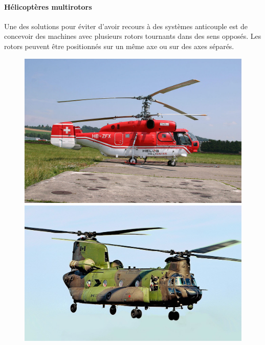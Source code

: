 		\paragraph{Hélicoptères multirotors}
		Une des solutions pour éviter d'avoir recours à des systèmes anticouple est de concevoir des machines avec plusieurs rotors tournants dans des sens opposés. Les rotors peuvent être positionnés sur un même axe ou sur des axes séparés.
		
		\begin{center}
		\begin{minipage}[c]{1.0\linewidth}
		\begin{figure}[H]
		\begin{minipage}[c]{0.5\linewidth}
		\centering
		\includegraphics[trim={0 20px 0 0},clip, width=0.95\linewidth]{01-EtudeAeronefs/img/KamowK32A.jpg}
		\end{minipage}
		\begin{minipage}[c]{0.5\linewidth}
		\centering
		\includegraphics[width=0.95\linewidth]{01-EtudeAeronefs/img/CH-147F.jpg}
		\end{minipage}
		\end{figure}
		\end{minipage}
		\end{center}
		
